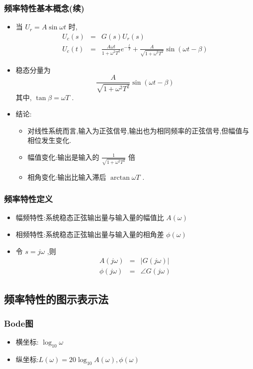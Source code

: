 \documentclass[table]{article}
\begin{document}
\subsubsection{频率特性基本概念(续)}
\label{sec:orgd4eaee9}
\begin{itemize}
\item <2->当 \(U_r=A\sin\omega t\) 时,
\begin{eqnarray*}
U_c(s) & =& G(s)U_r(s)\\
U_c(t) &=& \frac{A\omega t}{1+\omega^2 T^2}e^{-\frac{t}{T}}+\frac{A}{\sqrt{1+\omega^2 T^2}}\sin(\omega t-\beta)
\end{eqnarray*}
\item <3->稳态分量为 
\[\frac{A}{\sqrt{1+\omega^2 T^2}}\sin(\omega t-\beta)\]
 其中, \(\tan\beta=\omega T\) .
\item <4->结论:
\begin{itemize}
\item <4->对线性系统而言,输入为正弦信号,输出也为相同频率的正弦信号,但幅值与相位发生变化.
\item <5->幅值变化:输出是输入的  \(\frac{1}{\sqrt{1+\omega^2 T^2}}\)  倍
\item <6->相角变化:输出比输入滞后  \(\arctan \omega T\)  .
\end{itemize}
\end{itemize}
\subsubsection{频率特性定义}
\label{sec:org9a58f28}
\begin{itemize}
\item <2->幅频特性:系统稳态正弦输出量与输入量的幅值比  \(A(\omega)\)
\item <3->相频特性:系统稳态正弦输出量与输入量的相角差  \(\phi(\omega)\)
\item <4->令  \(s=j\omega\)  ,则
\begin{eqnarray*}
A(j\omega)&=&|G(j\omega)|  \\
\phi(j\omega) &=& \angle G(j\omega)
\end{eqnarray*}
\end{itemize}
\subsection{频率特性的图示表示法}
\label{sec:org7e01d02}
\subsubsection{Bode图}
\label{sec:org1fab889}
\begin{itemize}
\item <2->横坐标:  \(\log_{10}\omega\)
\item <2->纵坐标:\(L(\omega)=20\log_{10}A(\omega),\phi(\omega)\)
\end{itemize}
\end{document}
